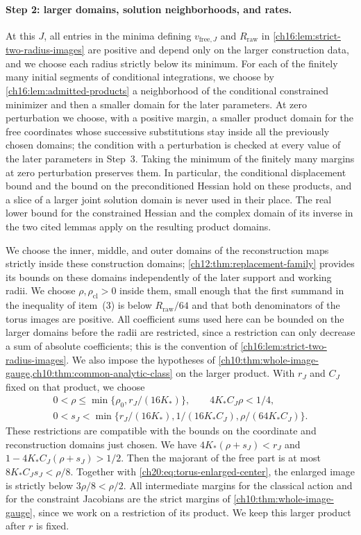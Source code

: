 \paragraph{Step 2: larger domains, solution neighborhoods, and rates.}
At this $J$, all entries in the minima defining $v_{\mathrm{free},J}$ and $R_{\mathrm{raw}}$ in \cref{ch16:lem:strict-two-radius-images} are positive and depend only on the larger construction data, and we choose each radius strictly below its minimum. For each of the finitely many initial segments of conditional integrations, we choose by \cref{ch16:lem:admitted-products} a neighborhood of the conditional constrained minimizer and then a smaller domain for the later parameters. At zero perturbation we choose, with a positive margin, a smaller product domain for the free coordinates whose successive substitutions stay inside all the previously chosen domains; the condition with a perturbation is checked at every value of the later parameters in Step~3. Taking the minimum of the finitely many margins at zero perturbation preserves them. In particular, the conditional displacement bound and the bound on the preconditioned Hessian hold on these products, and a slice of a larger joint solution domain is never used in their place. The real lower bound for the constrained Hessian and the complex domain of its inverse in the two cited lemmas apply on the resulting product domains.

We choose the inner, middle, and outer domains of the reconstruction maps strictly inside these construction domains; \cref{ch12:thm:replacement-family} provides its bounds on these domains independently of the later support and working radii. We choose $\rho,\rho_{\mathrm{cl}}>0$ inside them, small enough that the first summand in the inequality of item~(3) is below $R_{\mathrm{raw}}/64$ and that both denominators of the torus images are positive. All coefficient sums used here can be bounded on the larger domains before the radii are restricted, since a restriction can only decrease a sum of absolute coefficients; this is the convention of \cref{ch16:lem:strict-two-radius-images}. We also impose the hypotheses of \cref{ch10:thm:whole-image-gauge,ch10:thm:common-analytic-class} on the larger product. With $r_J$ and $C_J$ fixed on that product, we choose
\begin{equation}\label{ch20:eq:outer-torus-domains}
 \begin{gathered}
 0<\rho\le\min\{\rho_0,r_J/(16K_*)\},\qquad 4K_*C_J\rho<1/4,\\
 0<s_J<\min\{r_J/(16K_*),1/(16K_*C_J),\rho/(64K_*C_J)\}.
 \end{gathered}
\end{equation}
These restrictions are compatible with the bounds on the coordinate and reconstruction domains just chosen. We have $4K_*(\rho+s_J)<r_J$ and $1-4K_*C_J(\rho+s_J)>1/2$. Then the majorant of the free part is at most $8K_*C_Js_J<\rho/8$. Together with \eqref{ch20:eq:torus-enlarged-center}, the enlarged image is strictly below $3\rho/8<\rho/2$. All intermediate margins for the classical action and for the constraint Jacobians are the strict margins of \cref{ch10:thm:whole-image-gauge}, since we work on a restriction of its product. We keep this larger product after $r$ is fixed.

